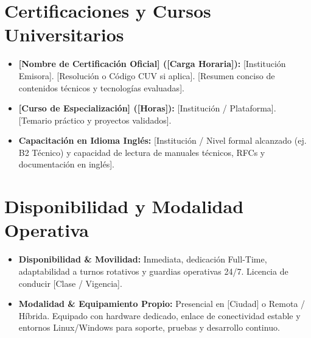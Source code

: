 \documentclass[10pt,a4paper]{article}
\begin{document}
\section{Certificaciones y Cursos Universitarios}

\begin{itemize}
    \item \textbf{[Nombre de Certificación Oficial] ([Carga Horaria]):} [Institución Emisora]. [Resolución o Código CUV si aplica]. [Resumen conciso de contenidos técnicos y tecnologías evaluadas].
    \item \textbf{[Curso de Especialización] ([Horas]):} [Institución / Plataforma]. [Temario práctico y proyectos validados].
    \item \textbf{Capacitación en Idioma Inglés:} [Institución / Nivel formal alcanzado (ej. B2 Técnico) y capacidad de lectura de manuales técnicos, RFCs y documentación en inglés].
\end{itemize}

\section{Disponibilidad y Modalidad Operativa}
\begin{itemize}
    \item \textbf{Disponibilidad \& Movilidad:} Inmediata, dedicación Full-Time, adaptabilidad a turnos rotativos y guardias operativas 24/7. Licencia de conducir [Clase / Vigencia].
    \item \textbf{Modalidad \& Equipamiento Propio:} Presencial en [Ciudad] o Remota / Híbrida. Equipado con hardware dedicado, enlace de conectividad estable y entornos Linux/Windows para soporte, pruebas y desarrollo continuo.
\end{itemize}
\end{document}
